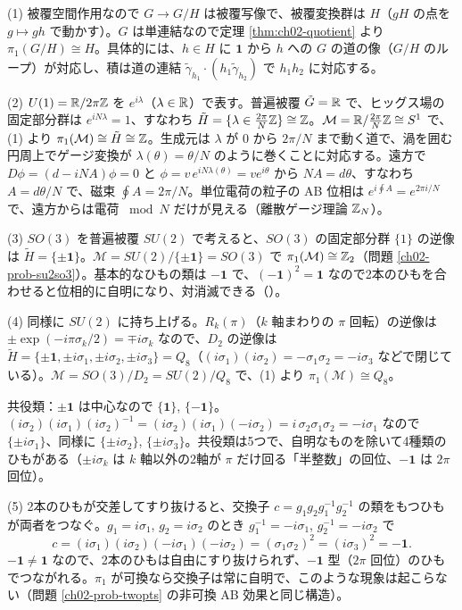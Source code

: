 \begin{solution}
(1) 被覆空間作用なので $G\to G/H$ は被覆写像で、被覆変換群は $H$（$gH$ の点を $g\mapsto gh$ で動かす）。$G$ は単連結なので定理 \ref{thm:ch02-quotient} より $\pi_1(G/H)\cong H$。具体的には、$h\in H$ に $\mathbf 1$ から $h$ への $G$ の道の像（$G/H$ のループ）が対応し、積は道の連結 $\tilde\gamma_{h_1}\cdot(h_1\tilde\gamma_{h_2})$ で $h_1h_2$ に対応する。

(2) $U(1)=\mathbb{R}/2\pi\mathbb{Z}$ を $e^{i\lambda}$（$\lambda\in\mathbb{R}$）で表す。普遍被覆 $\tilde G=\mathbb{R}$ で、ヒッグス場の固定部分群は $e^{iN\lambda}=1$、すなわち $\tilde H=\{\lambda\in\tfrac{2\pi}{N}\mathbb{Z}\}\cong\mathbb{Z}$。$\mathcal M=\mathbb{R}/\tfrac{2\pi}{N}\mathbb{Z}\cong S^1$ で、(1) より $\pi_1(\mathcal M)\cong\tilde H\cong\mathbb{Z}$。生成元は $\lambda$ が $0$ から $2\pi/N$ まで動く道で、渦を囲む円周上でゲージ変換が $\lambda(\theta)=\theta/N$ のように巻くことに対応する。遠方で $D\phi=(d-iNA)\phi=0$ と $\phi=v\,e^{iN\lambda(\theta)}=ve^{i\theta}$ から $NA=d\theta$、すなわち $A=d\theta/N$ で、磁束 $\oint A=2\pi/N$。単位電荷の粒子の AB 位相は $e^{i\oint A}=e^{2\pi i/N}$ で、遠方からは電荷 $\bmod N$ だけが見える（離散ゲージ理論 $\mathbb{Z}_N$）。

(3) $SO(3)$ を普遍被覆 $SU(2)$ で考えると、$SO(3)$ の固定部分群 $\{1\}$ の逆像は $\tilde H=\{\pm\mathbf 1\}$。$\mathcal M=SU(2)/\{\pm\mathbf 1\}=SO(3)$ で $\pi_1(\mathcal M)\cong\mathbb{Z}_2$（問題 \ref{ch02-prob-su2so3}）。基本的なひもの類は $-\mathbf 1$ で、$(-\mathbf 1)^2=\mathbf 1$ なので2本のひもを合わせると位相的に自明になり、対消滅できる（）。

(4) 同様に $SU(2)$ に持ち上げる。$R_k(\pi)$（$k$ 軸まわりの $\pi$ 回転）の逆像は $\pm\exp(-i\pi\sigma_k/2)=\mp i\sigma_k$ なので、$D_2$ の逆像は $\tilde H=\{\pm\mathbf 1,\pm i\sigma_1,\pm i\sigma_2,\pm i\sigma_3\}=Q_8$（$(i\sigma_1)(i\sigma_2)=-\sigma_1\sigma_2=-i\sigma_3$ などで閉じている）。$\mathcal M=SO(3)/D_2=SU(2)/Q_8$ で、(1) より $\pi_1(\mathcal M)\cong Q_8$。

共役類：$\pm\mathbf 1$ は中心なので $\{\mathbf 1\}$, $\{-\mathbf 1\}$。$(i\sigma_2)(i\sigma_1)(i\sigma_2)^{-1}=(i\sigma_2)(i\sigma_1)(-i\sigma_2)=i\,\sigma_2\sigma_1\sigma_2=-i\sigma_1$ なので $\{\pm i\sigma_1\}$、同様に $\{\pm i\sigma_2\}$, $\{\pm i\sigma_3\}$。共役類は5つで、自明なものを除いて4種類のひもがある（$\pm i\sigma_k$ は $k$ 軸以外の2軸が $\pi$ だけ回る「半整数」の回位、$-\mathbf 1$ は $2\pi$ 回位）。

(5) 2本のひもが交差してすり抜けると、交換子 $c=g_1g_2g_1^{-1}g_2^{-1}$ の類をもつひもが両者をつなぐ。$g_1=i\sigma_1$, $g_2=i\sigma_2$ のとき $g_1^{-1}=-i\sigma_1$, $g_2^{-1}=-i\sigma_2$ で
\[
c=(i\sigma_1)(i\sigma_2)(-i\sigma_1)(-i\sigma_2)=(\sigma_1\sigma_2)^2=(i\sigma_3)^2=-\mathbf 1 .
\]
$-\mathbf 1\ne\mathbf 1$ なので、2本のひもは自由にすり抜けられず、$-\mathbf 1$ 型（$2\pi$ 回位）のひもでつながれる。$\pi_1$ が可換なら交換子は常に自明で、このような現象は起こらない（問題 \ref{ch02-prob-twopts} の非可換 AB 効果と同じ構造）。
\end{solution}

